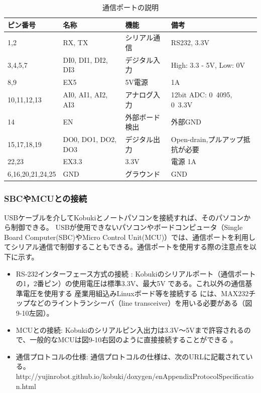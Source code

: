\begin{table}[htp]
\centering
\small
\begin{tabular}{p{3cm} p{3cm} p{3cm} p{3cm}}
\toprule
\textbf{ピン番号} & \textbf{名称} & \textbf{機能} & \textbf{備考}\\
\midrule
1,2 & RX, TX  & シリアル通信  & RS232, 3.3V \\
3,4,5,7 & DI0, DI1, DI2, DI3  & デジタル入力  & High: 3.3 - 5V, Low: 0V \\
8,9 & EX5 & 5V電源  & 1A \\
10,11,12,13 & AI0, AI1, AI2, AI3  & アナログ入力  & 12bit ADC: 0~4095, 0~3.3V \\
14  & EN  & 外部ボード検出 & 外部GND \\
15,17,18,19 & DO0, DO1, DO2, DO3  & デジタル出力  & Open-drain,プルアップ抵抗が必要} \\
22,23 & EX3.3 & 3.3V & 電源 1A \\
6,16,20,21,24,25  & GND & グラウンド & GND \\
\bottomrule
\end{tabular}
\caption{通信ポートの説明}
\end{table}

\subsubsection{SBCやMCUとの接続}

USBケーブルを介してKobukiとノートパソコンを接続すれば、そのパソコンから制御できる。  USBが使用できないパソコンやボードコンピュータ（Single Board Computer(SBC)やMicro Control Unit(MCU)）では、通信ポートを利用してシリアル通信で制御することもできる。通信ポートを使用する際の注意点を以下に示す。

\begin{itemize}
\item RS-232インターフェース方式の接続  : Kobukiのシリアルポート（通信ポートの1，2番ピン）の使用電圧は標準3.3V、最大5V   である。これ以外の通信基準電圧を使用する 産業用組込みLinuxボード等を接続する   には、MAX232チップなどのライントランシーバ（line transceiver）を用いる必要がある（図9-10左図）。
\item MCUとの接続: Kobukiのシリアルピン入出力は3.3V〜5Vまで許容されるので、一般的なMCUは図9-10右図のように直接接続することができる  。
\item 通信プロトコルの仕様: 通信プロトコルの仕様は、次のURLに記載されている。
\\http://yujinrobot.github.io/kobuki/doxygen/enAppendixProtocolSpecification.html
\end{itemize}

